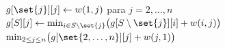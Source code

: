 \documentclass[11pt,letterpaper]{article}
\begin{document}
\begin{algorithm}[H]
\caption{\textsc{Agente-Viajero}$(w, n)$: programación dinámica de
         Held y Karp}
\label{alg:hamilton-held-karp}
\begin{algorithmic}[1]
  \State $g[\set{j}][j] \gets w(1, j)$ para $j = 2, \dots, n$
   
        \State $g[S][j] \gets \min_{i \in S \setminus \set{j}}
               \bigl( g[S \setminus \set{j}][i] + w(i, j) \bigr)$
      \EndFor
    \EndFor
  \EndFor
  \State \Return $\min_{2 \le j \le n}
         \bigl( g[\set{2, \dots, n}][j] + w(j, 1) \bigr)$
\EndProcedure
\end{algorithmic}
\end{algorithm}
\end{document}
